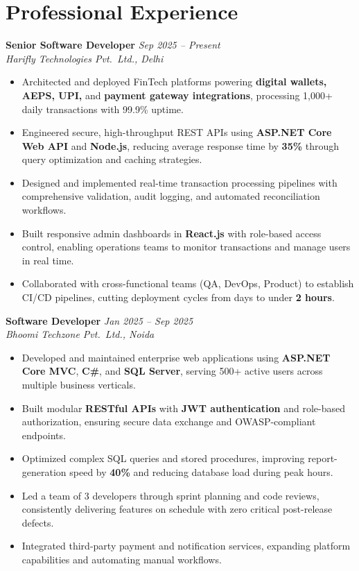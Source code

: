 \documentclass[11pt, a4paper]{article}
\begin{document}
\section*{Professional Experience}

\textbf{Senior Software Developer} \hfill \textit{Sep 2025 -- Present} \\
\textit{Harifly Technologies Pvt.\ Ltd., Delhi}
\begin{itemize}
  \item Architected and deployed FinTech platforms powering \textbf{digital wallets, AEPS, UPI,} and \textbf{payment gateway integrations}, processing 1,000+ daily transactions with 99.9\% uptime.
  \item Engineered secure, high-throughput REST APIs using \textbf{ASP.NET Core Web API} and \textbf{Node.js}, reducing average response time by \textbf{35\%} through query optimization and caching strategies.
  \item Designed and implemented real-time transaction processing pipelines with comprehensive validation, audit logging, and automated reconciliation workflows.
  \item Built responsive admin dashboards in \textbf{React.js} with role-based access control, enabling operations teams to monitor transactions and manage users in real time.
  \item Collaborated with cross-functional teams (QA, DevOps, Product) to establish CI/CD pipelines, cutting deployment cycles from days to under \textbf{2 hours}.
\end{itemize}

\vspace{4pt}

\textbf{Software Developer} \hfill \textit{Jan 2025 -- Sep 2025} \\
\textit{Bhoomi Techzone Pvt.\ Ltd., Noida}
\begin{itemize}
  \item Developed and maintained enterprise web applications using \textbf{ASP.NET Core MVC}, \textbf{C\#}, and \textbf{SQL Server}, serving 500+ active users across multiple business verticals.
  \item Built modular \textbf{RESTful APIs} with \textbf{JWT authentication} and role-based authorization, ensuring secure data exchange and OWASP-compliant endpoints.
  \item Optimized complex SQL queries and stored procedures, improving report-generation speed by \textbf{40\%} and reducing database load during peak hours.
  \item Led a team of 3 developers through sprint planning and code reviews, consistently delivering features on schedule with zero critical post-release defects.
  \item Integrated third-party payment and notification services, expanding platform capabilities and automating manual workflows.
\end{itemize}
\end{document}

